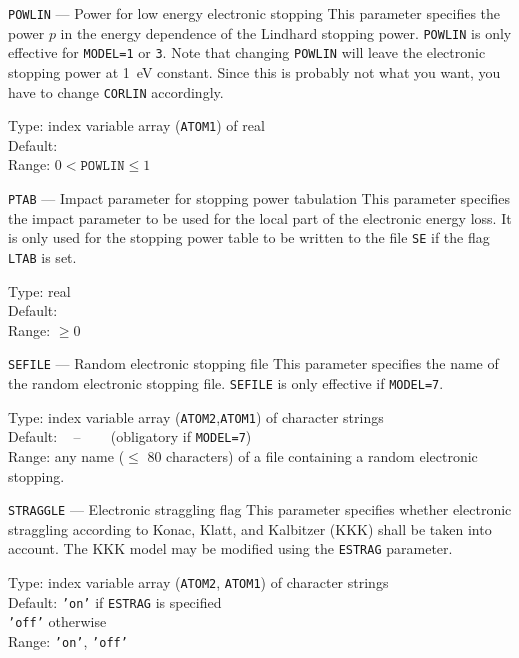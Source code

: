 \begin{keydescription}{\texttt{POWLIN} --- Power for low energy
    electronic stopping}
%
  This parameter specifies the power $p$ in the energy dependence of
  the Lindhard stopping power.  \texttt{POWLIN} is only effective for
  \texttt{MODEL=1} or \texttt{3}. Note that changing \texttt{POWLIN} 
  will leave the electronic stopping power at 1~eV constant. Since this 
  is probably not what you want, you have to change \texttt{CORLIN} 
  accordingly. 
  \begin{keytab}
    Type:    \> index variable array (\texttt{ATOM1}) of real \\
    Default:  \\
    Range:   \> $0 < \texttt{POWLIN} \le 1$
  \end{keytab}
\end{keydescription}

\begin{keydescription}{\texttt{PTAB} --- Impact parameter for stopping
    power tabulation}
%
  This parameter specifies the impact parameter to be used for the local
  part of the electronic energy loss. It is only used for the stopping
  power table to be written to the file \texttt{SE} if the flag 
  \texttt{LTAB} is set.
  \begin{keytab}
    Type:    \> real \\
    Default:  \\
    Range:   \> $\ge 0$
  \end{keytab}
\end{keydescription}

\begin{keydescription}{\texttt{SEFILE} --- Random electronic stopping file}
%
  This parameter specifies the name of the random electronic stopping
  file. \texttt{SEFILE} is only effective if \texttt{MODEL=7}.
  \begin{keytab}
    Type:    \> index variable array (\texttt{ATOM2},\texttt{ATOM1}) 
                of character strings \\
    Default: \> ~ -- ~~~ (obligatory if \texttt{MODEL=7}) \\
    Range:   \> any name ($\le$ 80 characters) of a file containing a random
    electronic stopping.
  \end{keytab}
\end{keydescription}

\begin{keydescription}{\texttt{STRAGGLE} --- Electronic straggling flag}
%
  This parameter specifies whether electronic straggling according to
  Konac, Klatt, and Kalbitzer (KKK) shall be taken into account. The
  KKK model may be modified using the \texttt{ESTRAG} parameter.
  \begin{keytab}
    Type:    \> index variable array (\texttt{ATOM2}, \texttt{ATOM1})
                of character strings \\
    Default: \> \texttt{'on'} if \texttt{ESTRAG} is specified \\
             \> \texttt{'off'} otherwise \\
    Range:   \> \texttt{'on'}, \texttt{'off'}
  \end{keytab}
\end{keydescription}

